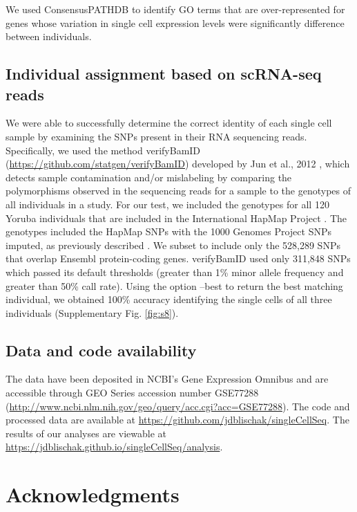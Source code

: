 We used ConsensusPATHDB \citep{Kamburov2011} to identify GO terms that
are over-represented for genes whose variation in single cell expression
levels were significantly difference between individuals.

\subsection{Individual assignment based on scRNA-seq
reads}\label{individual-assignment-based-on-scrna-seq-reads}

We were able to successfully determine the correct identity of each
single cell sample by examining the SNPs present in their RNA sequencing
reads. Specifically, we used the method verifyBamID
(\url{https://github.com/statgen/verifyBamID}) developed by Jun et al.,
2012 \citep{Jun2012}, which detects sample contamination and/or
mislabeling by comparing the polymorphisms observed in the sequencing
reads for a sample to the genotypes of all individuals in a study. For
our test, we included the genotypes for all 120 Yoruba individuals that
are included in the International HapMap Project
\citep{HapMapConsortium2005}. The genotypes included the HapMap SNPs with
the 1000 Genomes Project SNPs \citep{OneKGConsortium2012} imputed, as
previously described \citep{McVicker2013}. We subset to include only the
528,289 SNPs that overlap Ensembl protein-coding genes. verifyBamID used
only 311,848 SNPs which passed its default thresholds (greater than 1\%
minor allele frequency and greater than 50\% call rate). Using the
option --best to return the best matching individual, we obtained 100\%
accuracy identifying the single cells of all three individuals
(Supplementary Fig. \ref{fig:s8}).

\subsection{Data and code
availability}\label{data-and-code-availability}

The data have been deposited in NCBI's Gene Expression Omnibus
\citep{Edgar2002} and are accessible through GEO Series accession number
GSE77288
(\url{http://www.ncbi.nlm.nih.gov/geo/query/acc.cgi?acc=GSE77288}). The
code and processed data are available at
\url{https://github.com/jdblischak/singleCellSeq}. The results of our
analyses are viewable at
\url{https://jdblischak.github.io/singleCellSeq/analysis}.

\section{Acknowledgments}\label{acknowledgments}

